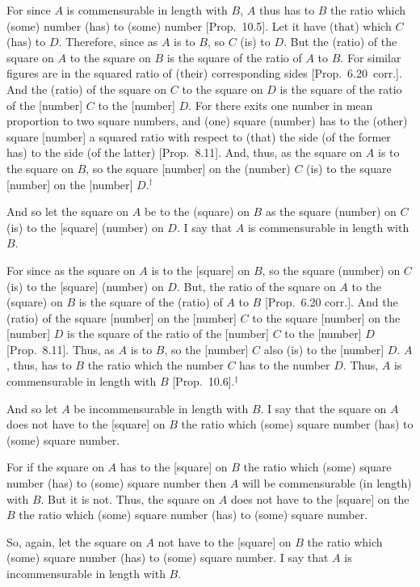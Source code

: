 \begin{Parallel}{}{}
{For since $A$ is commensurable in length with $B$, $A$ thus
has to $B$ the ratio which (some) number (has) to (some) number [Prop.~10.5]. Let it have (that) which $C$ (has) to $D$.
Therefore, since as $A$ is to $B$, so $C$ (is) to $D$. But the (ratio)
of the square on $A$ to the square on $B$ is the square of the
ratio of $A$ to $B$. For similar figures are in the squared ratio of (their) corresponding sides [Prop.~6.20~corr.].
And the (ratio) of the square on $C$ to the square on $D$ is the
square of the ratio of the [number] $C$ to the [number] $D$.
For there exits one number in mean proportion to two square numbers,
and (one) square (number) has to the (other) square [number] a squared ratio
with respect to (that) the side (of the former has) to the side (of the latter)
[Prop.~8.11]. And, thus,  as the square on $A$
is to the square on $B$, so the square  [number] on the (number) $C$ (is) to
the square [number] on the [number] $D$.$^\dag$

And so let the square on $A$ be to the (square) on $B$ as the
square (number) on $C$ (is) to the [square] (number) on $D$. I say
that $A$ is commensurable in length  with $B$.

For since as the square on $A$ is to the [square] on $B$, so the
square (number) on $C$ (is) to the [square] (number) on $D$. But,
the ratio of the square on $A$ to the (square) on $B$ is the square
of the (ratio) of $A$ to $B$ [Prop.~6.20 corr.].
And the (ratio) of the square [number] on the [number] $C$ to
the square [number] on the [number] $D$ is the square of the ratio
of the [number] $C$ to the [number] $D$ [Prop.~8.11].  Thus, as $A$ is to $B$, so the
[number] $C$ also (is) to the [number] $D$.
$A$, thus,  has to $B$ the ratio
which the number $C$ has to the number $D$. Thus, $A$ is
commensurable in length with $B$ [Prop.~10.6].$^\ddag$

And so let $A$ be incommensurable in length with $B$. I say that
 the square on $A$ does not have to the [square] on $B$ the ratio
which (some) square number (has) to (some) square number.

For if the square on $A$ has to the [square] on $B$ the ratio which
(some) square number (has) to (some) square number then $A$
will be commensurable (in length) with $B$. But it is not. Thus, the square on $A$
does not have to the [square] on the $B$ the ratio which (some)
square number (has) to (some) square number.

So, again, let the square on $A$ not have to the [square] on $B$
the ratio which (some) square number (has) to (some) square number.
I say that $A$ is incommensurable in length with $B$.

}
\end{Parallel}
